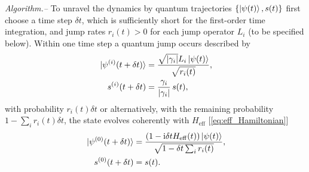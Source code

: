 \documentclass[twocolumn,prl,superscriptaddress]{revtex4-2}
\newcommand{\eff}{\mathrm{eff}}
\renewcommand{\i}{\mathrm i}
\begin{document}
\emph{Algorithm.--}
To unravel the dynamics by quantum trajectories $\{ \ket{\psi(t)} , s(t) \}$ first choose a time step $\delta t$, which is sufficiently short for the first-order time integration, and jump rates $r_i(t)>0$ for each jump operator $L_i$ (to be specified below). Within one time step a quantum jump occurs described by
\begin{align}
	\begin{aligned}
		\ket*{\psi^{(i)}(t+ \delta t)} &= \frac{\sqrt{|\gamma_i|} L_i \ket{\psi(t)}} {\sqrt{r_i(t)}} , \\
		s^{(i)}(t+ \delta t) &= \frac{\gamma_i}{|\gamma_i|}\, s(t),
		\label{eq:jump}
	\end{aligned}
\end{align} 
with probability $r_i(t)\delta t$
or alternatively, with the remaining probability $1-\sum_i r_i(t)  \delta t$, the state evolves coherently with $H_\mathrm{eff}$ [\cref{eq:eff_Hamiltonian}]  \cite{footnote_det}%
\begin{align}
	\ket*{\psi^{(0)}(t+\delta t)} &= \frac{(1 -\i \delta t  H_\eff(t)) \ket{\psi(t)}}{\sqrt{1-\delta t \sum_i r_i(t)}} , 	\label{eq:stQTdet} \\
	s^{(0)}(t+\delta t)&=s(t).
\end{align} 
\end{document}
